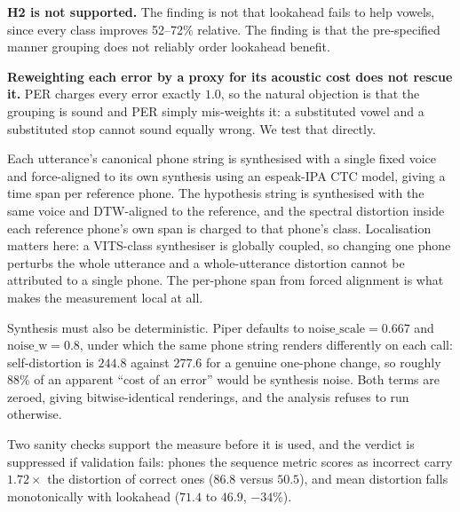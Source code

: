 \documentclass[journal]{IEEEtran}
\begin{document}
\textbf{H2 is not supported.} The finding is not that lookahead fails to help
vowels, since every class improves 52--72\% relative. The finding is that the
pre-specified manner grouping does not reliably order lookahead benefit.

\textbf{Reweighting each error by a proxy for its acoustic cost does not rescue
it.} PER charges every error exactly $1.0$, so the natural objection is that
the grouping is sound and PER simply mis-weights it: a substituted vowel and a
substituted stop cannot sound equally wrong. We test that directly.

Each utterance's canonical phone string is synthesised with a single fixed
voice and force-aligned to its own synthesis using an espeak-IPA CTC model,
giving a time span per reference phone. The hypothesis string is synthesised
with the same voice and DTW-aligned to the reference, and the spectral
distortion inside each reference phone's own span is charged to that phone's
class. Localisation matters here: a VITS-class synthesiser is globally coupled,
so changing one phone perturbs the whole utterance and a whole-utterance
distortion cannot be attributed to a single phone. The per-phone span from
forced alignment is what makes the measurement local at all.

Synthesis must also be deterministic. Piper defaults to
$\mathrm{noise\_scale}=0.667$ and $\mathrm{noise\_w}=0.8$, under which the same
phone string renders differently on each call: self-distortion is $244.8$
against $277.6$ for a genuine one-phone change, so roughly 88\% of an apparent
``cost of an error'' would be synthesis noise. Both terms are zeroed, giving
bitwise-identical renderings, and the analysis refuses to run otherwise.

Two sanity checks support the measure before it is used, and the verdict is suppressed if
validation fails: phones the sequence metric scores as incorrect carry
$1.72\times$ the distortion of correct ones ($86.8$ versus $50.5$), and mean
distortion falls monotonically with lookahead ($71.4$ to $46.9$, $-34\%$).
\end{document}
